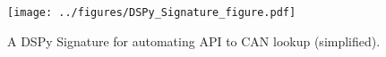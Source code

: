 \begin{figure}[ht]
    \centering
    \texttt{[image: ../figures/DSPy\_Signature\_figure.pdf]}
    \vspace{-1cm}
    \caption{A DSPy Signature for automating API to CAN lookup (simplified).}
    \label{fig:DSPy-Signature}
\end{figure}
